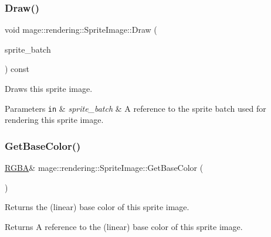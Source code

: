 \subsubsection{\texorpdfstring{Draw()}{Draw()}}
{\footnotesize\ttfamily void mage\+::rendering\+::\+Sprite\+Image\+::\+Draw (\begin{DoxyParamCaption}\item[{\mbox{\hyperlink{classmage_1_1rendering_1_1_sprite_batch}{Sprite\+Batch}} \&}]{sprite\+\_\+batch }\end{DoxyParamCaption}) const}

Draws this sprite image.


\begin{DoxyParams}[1]{Parameters}
\mbox{\tt in}  & {\em sprite\+\_\+batch} & A reference to the sprite batch used for rendering this sprite image. \\
\hline
\end{DoxyParams}
\mbox{\label{classmage_1_1rendering_1_1_sprite_image_ab1ef6e7677aa9e98fa55b6d64befdd63}} 
\subsubsection{\texorpdfstring{Get\+Base\+Color()}{GetBaseColor()}\hspace{0.1cm}{\footnotesize\ttfamily [1/2]}}
{\footnotesize\ttfamily \mbox{\hyperlink{structmage_1_1_r_g_b_a}{R\+G\+BA}}\& mage\+::rendering\+::\+Sprite\+Image\+::\+Get\+Base\+Color (\begin{DoxyParamCaption}{ }\end{DoxyParamCaption})\hspace{0.3cm}{\ttfamily [noexcept]}}

Returns the (linear) base color of this sprite image.

\begin{DoxyReturn}{Returns}
A reference to the (linear) base color of this sprite image. 
\end{DoxyReturn}
\mbox{\label{classmage_1_1rendering_1_1_sprite_image_a8d86a293c822486ab1cf37a31c2b0b74}} 
